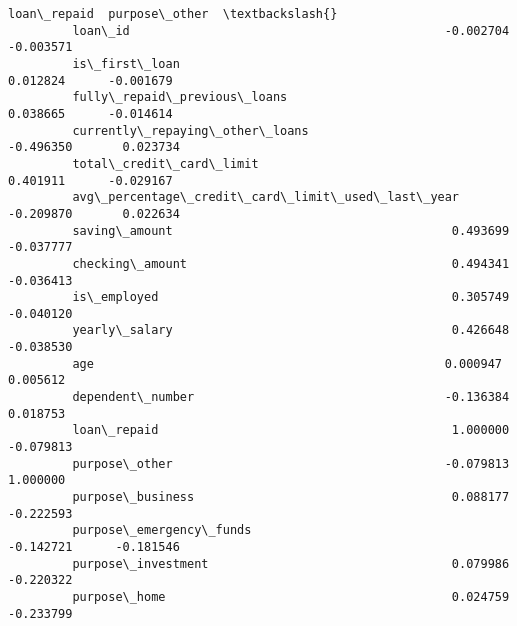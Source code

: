 \documentclass{report}
\begin{document}
\begin{Verbatim}[commandchars=\\\{\}]
                                                          loan\_repaid  purpose\_other  \textbackslash{}
         loan\_id                                            -0.002704      -0.003571   
         is\_first\_loan                                       0.012824      -0.001679   
         fully\_repaid\_previous\_loans                         0.038665      -0.014614   
         currently\_repaying\_other\_loans                     -0.496350       0.023734   
         total\_credit\_card\_limit                             0.401911      -0.029167   
         avg\_percentage\_credit\_card\_limit\_used\_last\_year    -0.209870       0.022634   
         saving\_amount                                       0.493699      -0.037777   
         checking\_amount                                     0.494341      -0.036413   
         is\_employed                                         0.305749      -0.040120   
         yearly\_salary                                       0.426648      -0.038530   
         age                                                 0.000947       0.005612   
         dependent\_number                                   -0.136384       0.018753   
         loan\_repaid                                         1.000000      -0.079813   
         purpose\_other                                      -0.079813       1.000000   
         purpose\_business                                    0.088177      -0.222593   
         purpose\_emergency\_funds                            -0.142721      -0.181546   
         purpose\_investment                                  0.079986      -0.220322   
         purpose\_home                                        0.024759      -0.233799   
         

\end{Verbatim}
\end{document}
